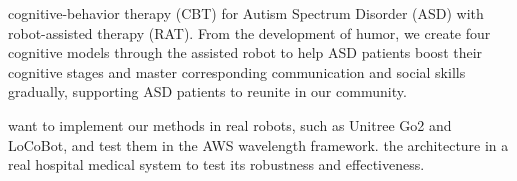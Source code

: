 \documentclass[letterpaper]{article} %
\begin{document}
 cognitive-behavior therapy (CBT) for Autism Spectrum Disorder (ASD) with robot-assisted therapy (RAT). From the development of humor, we create four cognitive models through the assisted robot to help ASD patients boost their cognitive stages and master corresponding communication and social skills gradually, supporting ASD patients to reunite in our community.

 want to implement our methods in real robots, such as Unitree Go2 and LoCoBot, and test them in the AWS wavelength framework.
 the architecture in a real hospital medical system to test its robustness and effectiveness.



\clearpage

\end{document}
